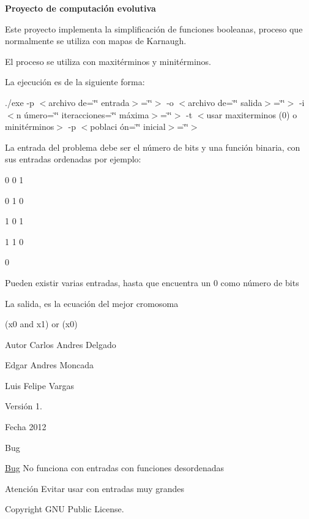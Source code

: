 {\bfseries Proyecto de computación evolutiva}\par
\par
 Este proyecto implementa la simplificación de funciones booleanas, proceso que normalmente se utiliza con mapas de Karnaugh.\par
\par
 El proceso se utiliza con maxitérminos y minitérminos.\par
 \par
 La ejecución es de la siguiente forma\-:\par
\par
 {\ttfamily  ./exe -\/p $<$archivo de=\char`\"{}\char`\"{} entrada$>$=\char`\"{}\char`\"{}$>$ -\/o $<$archivo de=\char`\"{}\char`\"{} salida$>$=\char`\"{}\char`\"{}$>$ -\/i $<$n úmero=\char`\"{}\char`\"{} iteracciones=\char`\"{}\char`\"{} máxima$>$=\char`\"{}\char`\"{}$>$ -\/t $<$usar maxiterminos (0) o minitérminos$>$ -\/p $<$poblaci ón=\char`\"{}\char`\"{} inicial$>$=\char`\"{}\char`\"{}$>$ }\par
\par
 La entrada del problema debe ser el número de bits y una función binaria, con sus entradas ordenadas por ejemplo\-: {\par
 0 0 1\par
 0 1 0\par
 1 0 1\par
 1 1 0\par
 0 }\par
\par
 Pueden existir varias entradas, hasta que encuentra un 0 como número de bits\par
 \par
 La salida, es la ecuación del mejor cromosoma\par
 {\ttfamily  (x0 and x1) or (x0) } \begin{DoxyAuthor}{Autor}
Carlos Andres Delgado 

Edgar Andres Moncada 

Luis Felipe Vargas 
\end{DoxyAuthor}
\begin{DoxyVersion}{Versión}
1. 
\end{DoxyVersion}
\begin{DoxyDate}{Fecha}
2012 
\end{DoxyDate}
\begin{DoxyRefDesc}{Bug}
\item[\hyperlink{bug__bug000001}{Bug}]No funciona con entradas con funciones desordenadas \end{DoxyRefDesc}
\begin{DoxyWarning}{Atención}
Evitar usar con entradas muy grandes 
\end{DoxyWarning}
\begin{DoxyCopyright}{Copyright}
G\-N\-U Public License. 
\end{DoxyCopyright}
